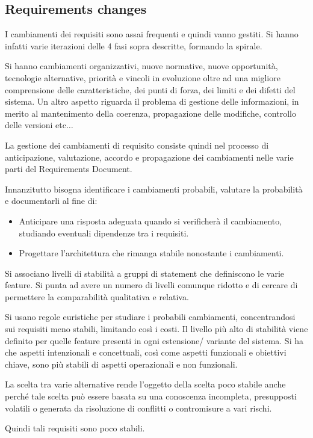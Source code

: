 \subsection{Requirements changes}
I cambiamenti dei requisiti sono assai frequenti e quindi vanno gestiti. Si hanno
infatti varie iterazioni delle 4 fasi sopra descritte, formando la spirale.

Si hanno cambiamenti organizzativi, nuove normative, nuove opportunità,
tecnologie alternative, priorità e vincoli in evoluzione oltre ad una migliore
comprensione delle caratteristiche, dei punti di forza, dei limiti e dei difetti
del sistema. Un altro aspetto riguarda il problema di gestione delle informazioni,
in merito al mantenimento della coerenza, propagazione delle modifiche, controllo
delle versioni etc$\dots$

La gestione dei cambiamenti di requisito consiste quindi nel processo di
anticipazione, valutazione, accordo e propagazione dei cambiamenti nelle varie
parti del Requirements Document.

Innanzitutto bisogna identificare i cambiamenti probabili, valutare la probabilità
e documentarli al fine di:
\begin{itemize}
      \item Anticipare una risposta adeguata quando si verificherà il cambiamento,
            studiando eventuali dipendenze tra i requisiti.
      \item Progettare l'architettura che rimanga stabile nonostante i cambiamenti.
\end{itemize}
Si associano  livelli di stabilità a gruppi di statement che definiscono le
varie feature. Si punta ad avere un numero di livelli comunque ridotto e di
cercare di permettere la comparabilità qualitativa e relativa.

Si usano regole euristiche per studiare i probabili cambiamenti, concentrandosi
sui requisiti meno stabili, limitando così i costi. Il livello più
alto di stabilità viene definito per quelle feature presenti in ogni estensione/
variante del sistema. Si ha che aspetti intenzionali e concettuali, così come
aspetti funzionali e obiettivi chiave, sono più stabili di aspetti operazionali
e non funzionali.

La scelta tra varie alternative rende l'oggetto della scelta poco stabile anche
perché tale scelta può essere basata su una conoscenza incompleta, presupposti
volatili o generata da risoluzione di conflitti o contromisure a vari rischi.

Quindi tali requisiti sono poco stabili.

